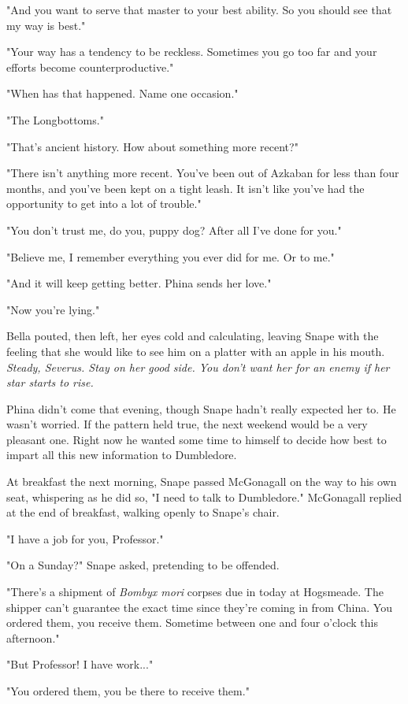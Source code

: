 \documentclass[a4paper,11pt]{article}
\begin{document}
"And you want to serve that master to your best ability. So you should see that my way is best."

"Your way has a tendency to be reckless. Sometimes you go too far and your efforts become counterproductive."

"When has that happened. Name one occasion."

"The Longbottoms."

"That's ancient history. How about something more recent?"

"There isn't anything more recent. You've been out of Azkaban for less than four months, and you've been kept on a tight leash. It isn't like you've had the opportunity to get into a lot of trouble."

"You don't trust me, do you, puppy dog? After all I've done for you."

"Believe me, I remember everything you ever did for me. Or to me."

"And it will keep getting better. Phina sends her love."

"Now you're lying."

Bella pouted, then left, her eyes cold and calculating, leaving Snape with the feeling that she would like to see him on a platter with an apple in his mouth. \emph{Steady, Severus. Stay on her good side. You don't want her for an enemy if her star starts to rise.}

Phina didn't come that evening, though Snape hadn't really expected her to. He wasn't worried. If the pattern held true, the next weekend would be a very pleasant one. Right now he wanted some time to himself to decide how best to impart all this new information to Dumbledore.

At breakfast the next morning, Snape passed McGonagall on the way to his own seat, whispering as he did so, "I need to talk to Dumbledore." McGonagall replied at the end of breakfast, walking openly to Snape's chair.

"I have a job for you, Professor."

"On a Sunday?" Snape asked, pretending to be offended.

"There's a shipment of \emph{Bombyx mori} corpses due in today at Hogsmeade. The shipper can't guarantee the exact time since they're coming in from China. You ordered them, you receive them. Sometime between one and four o'clock this afternoon."

"But Professor! I have work..."

"You ordered them, you be there to receive them."
\end{document}
